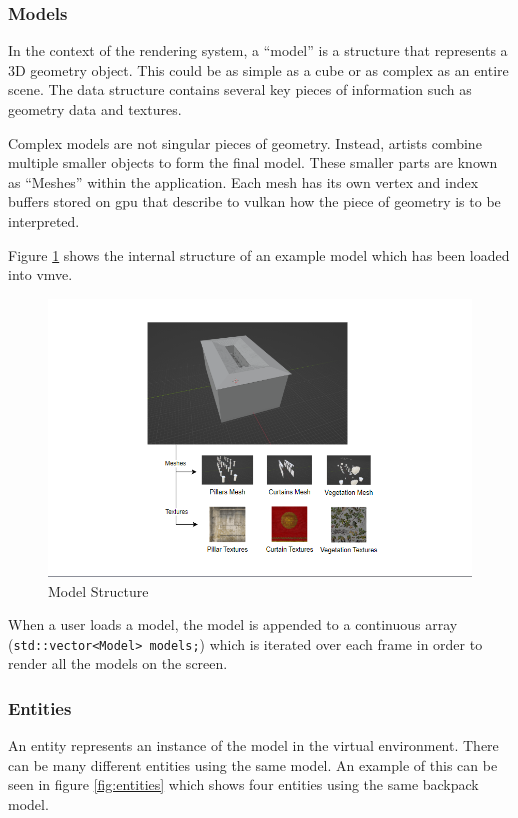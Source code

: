 \documentclass[11pt]{article}
\begin{document}
\subsubsection{Models}
In the context of the rendering system, a ``model'' is a structure that
represents a 3D geometry object. This could be as simple as a cube or as complex
as an entire scene. The data structure contains several key pieces of
information such as geometry data and textures. 

Complex models are not singular pieces of geometry. Instead, artists combine
multiple smaller objects to form the final model. These smaller parts are known
as ``Meshes'' within the application. Each mesh has its own vertex and index
buffers stored on \gls*{gpu} that describe to \gls*{vulkan} how the piece of
geometry is to be interpreted.

Figure \ref{fig:model} shows the internal structure of an example model which
has been loaded into \gls*{vmve}.
\begin{figure}[H]
  \centering
  \includegraphics[width=\textwidth]{images/model.png}
  \caption{Model Structure}
  \label{fig:model}
\end{figure}

When a user loads a model, the model is appended to a continuous array
(\lstinline{std::vector<Model> models;}) which is iterated over each frame in
order to render all the models on the screen.

\subsubsection{Entities}
An entity represents an instance of the model in the virtual environment. There
can be many different entities using the same model. An example of this can be
seen in figure \ref{fig:entities} which shows four entities using the same
backpack model.
\end{document}
